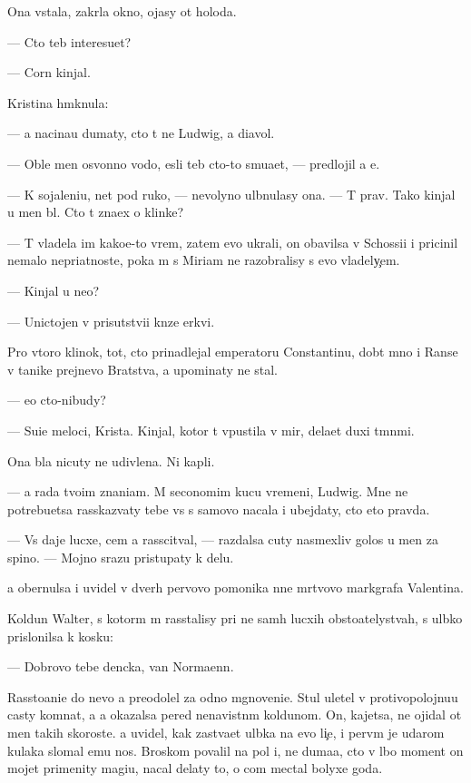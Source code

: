 \documentclass[10pt]{book}
\begin{document}
Ona vstala, zakr{\yi}la okno, {\y}ojasy ot holoda.

— Cto teb{\ia} interesu{\y}et?

—  Corn{\yi}{\y} kinjal.

Kristina hm{\yi}knula:

— {\Y}a nacina{\y}u dumaty, cto t{\yi} ne Ludwig, a diavol.

— Oble{\y} men{\ia} osv{\ia}{\x}onno{\y} vodo{\y}, {\y}esli teb{\ia} cto-to smu{\x}a{\y}et, — predlojil {\y}a {\y}e{\y}.

— K sojaleni{\y}u, net pod ruko{\y}, — nevolyno ul{\yi}bnulasy ona. — T{\yi} prav. Tako{\y} kinjal u men{\ia} b{\yi}l. Cto t{\yi} zna{\y}ex o klinke?

— T{\yi} vladela im kako{\y}e-to vrem{\ia}, zatem {\y}evo ukrali, on ob{\y}avilsa v Schossi{\y}i i pricinil nemalo nepri{\y}atnoste{\y}, poka m{\yi} s Miriam ne razobralisy s {\y}evo vladely{\c}em.

— Kinjal u ne{\y}o?

— Unictojen v prisutstvi{\y}i kn{\ia}ze{\y} {\C}erkvi.

Pro vtoro{\y} klinok, tot, cto prinadlejal emperatoru Constantinu, dob{\yi}t{\yi}{\y} mno{\y} i Ranse v ta{\y}nike prejnevo Bratstva, {\y}a upominaty ne stal.

— {\Y}e{\x}o cto-nibudy?

— Su{\x}i{\y}e meloci, Krista. Kinjal, kotor{\yi}{\y} t{\yi} v{\yi}pustila v mir, dela{\y}et duxi t{\e}mn{\yi}mi.

Ona b{\yi}la nicuty ne udivlena. Ni kapli.

— {\Y}a rada tvo{\y}im znani{\y}am. M{\yi} seconomim kucu vremeni, Ludwig. Mne ne potrebu{\y}etsa rasskaz{\yi}vaty tebe vs{\e} s samovo nacala i ubejdaty, cto eto pravda.

— Vs{\e} daje lucxe, cem {\y}a rasscit{\yi}val, — razdalsa cuty nasmexliv{\yi}{\y} golos u men{\ia} za spino{\y}. — Mojno srazu pristupaty k delu.

{\Y}a obernulsa i uvidel v dver{\ia}h pervovo pomo{\x}nika n{\yi}ne m{\e}rtvovo markgrafa Valentina.

Koldun Walter, s kotor{\yi}m m{\yi} rasstalisy pri ne sam{\yi}h lucxih obsto{\y}atelystvah, s ul{\yi}bko{\y} prislonilsa k kos{\ia}ku:

— Dobrovo tebe den{\e}cka, van Normaenn.

Rassto{\y}ani{\y}e do nevo {\y}a preodolel za odno mgnoveni{\y}e. Stul uletel v protivopolojnu{\y}u casty komnat{\yi}, a {\y}a okazalsa pered nenavistn{\yi}m koldunom. On, kajetsa, ne ojidal ot men{\ia} takih skoroste{\y}. {\Y}a uvidel, kak zast{\yi}va{\y}et ul{\yi}bka na {\y}evo li{\c}e, i perv{\yi}m je udarom kulaka slomal {\y}emu nos. Broskom povalil na pol i, ne duma{\y}a, cto v l{\io}bo{\y} moment on mojet primenity magi{\y}u, nacal delaty to, o com mectal bolyxe goda.
\end{document}
